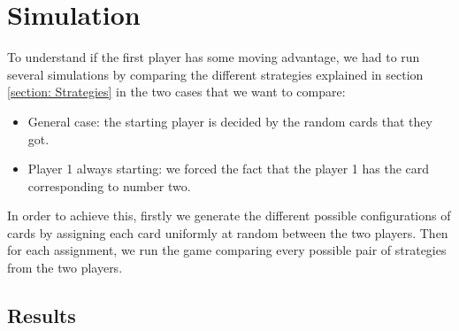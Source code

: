 \section{Simulation} \label{section:Simulation}%
To understand if the first player has some moving advantage, we had to run several simulations by comparing the different strategies explained in section \ref{section: Strategies} in the two cases that we want to compare:
\begin{itemize}
    \item General case: the starting player is decided by the random cards that they got.
    \item Player 1 always starting: we forced the fact that the player 1 has the card corresponding to number two.
\end{itemize}
In order to achieve this, firstly we generate the different possible configurations of cards by assigning each card uniformly at random between the two players. Then for each assignment, we run the game comparing every possible pair of strategies from the two players.

\subsection{Results} \label{subsection:Results}
